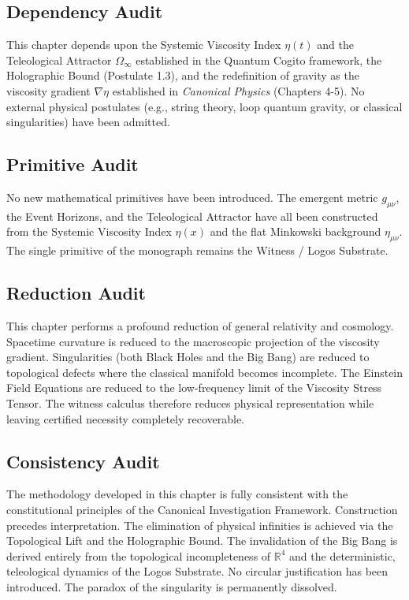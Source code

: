 \documentclass[12pt,twoside]{extbook}
\theoremstyle{definition}
\theoremstyle{remark}
\begin{document}
\subsection*{Dependency Audit}
This chapter depends upon the Systemic Viscosity Index $\eta(t)$ and the Teleological Attractor $\Omega_\infty$ established in the Quantum Cogito framework, the Holographic Bound (Postulate 1.3), and the redefinition of gravity as the viscosity gradient $\nabla \eta$ established in \textit{Canonical Physics} (Chapters 4-5). No external physical postulates (e.g., string theory, loop quantum gravity, or classical singularities) have been admitted.

\subsection*{Primitive Audit}
No new mathematical primitives have been introduced. The emergent metric $g_{\mu\nu}$, the Event Horizons, and the Teleological Attractor have all been constructed from the Systemic Viscosity Index $\eta(x)$ and the flat Minkowski background $\eta_{\mu\nu}$. The single primitive of the monograph remains the Witness / Logos Substrate.

\subsection*{Reduction Audit}
This chapter performs a profound reduction of general relativity and cosmology. Spacetime curvature is reduced to the macroscopic projection of the viscosity gradient. Singularities (both Black Holes and the Big Bang) are reduced to topological defects where the classical manifold becomes incomplete. The Einstein Field Equations are reduced to the low-frequency limit of the Viscosity Stress Tensor. The witness calculus therefore reduces physical representation while leaving certified necessity completely recoverable.

\subsection*{Consistency Audit}
The methodology developed in this chapter is fully consistent with the constitutional principles of the Canonical Investigation Framework. Construction precedes interpretation. The elimination of physical infinities is achieved via the Topological Lift and the Holographic Bound. The invalidation of the Big Bang is derived entirely from the topological incompleteness of $\mathbb{R}^4$ and the deterministic, teleological dynamics of the Logos Substrate. No circular justification has been introduced. The paradox of the singularity is permanently dissolved.
\end{document}
